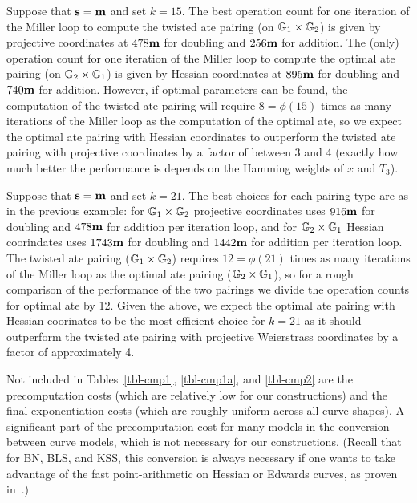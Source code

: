 \begin{example}
Suppose that $\textbf{s} = \textbf{m}$ and set $k = 15$.
The best operation count for one iteration of the Miller loop to compute the twisted ate pairing (on $\mathbb{G}_{1} \times \mathbb{G}_{2}$) is given by projective coordinates at 
$478\textbf{m}$ for doubling and $256\textbf{m}$ for addition.
The (only) operation count for one iteration of the Miller loop to compute the optimal ate pairing (on $\mathbb{G}_{2} \times \mathbb{G}_{1}$) is given by Hessian coordinates at
$895\textbf{m}$ for doubling and $740\textbf{m}$ for addition. 
However, if optimal parameters can be found, the computation of the twisted ate pairing 
will require $8 = \phi(15)$ times as many iterations of the Miller loop as the computation of the optimal ate, so we expect the optimal ate pairing with Hessian coordinates to outperform the twisted ate pairing with projective coordinates by a factor of between 3 and 4
(exactly how much better the performance is depends on the Hamming weights of $x$ and $T_3$).
\end{example}

\begin{example}
Suppose that $\textbf{s} = \textbf{m}$ and set $k = 21$.
The best choices for each pairing type are as in the previous example: 
for $\mathbb{G}_{1} \times \mathbb{G}_{2}$ projective coordinates uses $916\textbf{m}$ for doubling and $478\textbf{m}$ for addition per iteration loop,
and for $\mathbb{G}_{2} \times \mathbb{G}_{1}$ Hessian coorindates uses $1743\textbf{m}$ for doubling and $1442\textbf{m}$ for addition per iteration loop.
The twisted ate pairing ($\mathbb{G}_{1} \times \mathbb{G}_{2}$) requires $12 = \phi(21)$ times
as many iterations of the Miller loop as the optimal ate pairing ($\mathbb{G}_{2} \times \mathbb{G}_{1}$), 
so for a rough comparison of the performance of the two pairings we divide the operation counts for optimal ate by 12. 
Given the above, we expect the optimal ate pairing with Hessian coorinates to be the most efficient choice for $k=21$ as it should outperform the twisted ate pairing with projective Weierstrass coordinates by a factor of approximately 4.
\end{example}

Not included in Tables~\ref{tbl-cmp1}, \ref{tbl-cmp1a}, and \ref{tbl-cmp2} are the 
precomputation costs (which are relatively low for our constructions) and the final exponentiation costs (which are roughly uniform across all curve shapes).
A significant part of the precomputation cost for many models in the conversion
between curve models, which is not necessary for our constructions.
(Recall that for BN, BLS, and KSS, this conversion is always necessary if one wants to take advantage of
the fast point-arithmetic on Hessian or Edwards curves, as proven in~\cite{2013/bos-pairing}.)

